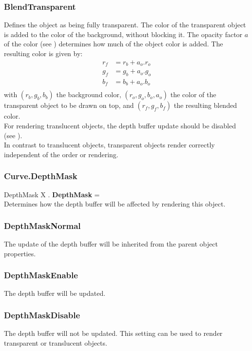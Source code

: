\subsubsection{BlendTransparent \label{T:BlendType|BlendTransparent}}
Defines the object as being fully transparent. The color of the transparent object is added to the color of the background, without blocking it. The opacity factor $a$ of the color (see ) determines how much of the object color is added. The resulting color is given by:
\begin{equation}
\begin{array}{rcl}
r_f & = r_b + a_o . r_o \\
g_f & = g_b + a_o . g_o \\
b_f & = b_b + a_o . b_o \\
\end{array}
\end{equation}
with $(r_b,g_b,b_b)$ the background color, $(r_o,g_o,b_o,a_o)$ the color of the transparent object to be drawn on top, and $(r_f,g_f,b_f)$ the resulting blended color. \\
For rendering translucent objects, the depth buffer update should be disabled (see ). \\
In contrast to translucent objects, transparent objects render correctly independent of the order or rendering.

\subsubsection{Curve.DepthMask \label{F:Curve:DepthMask}}
DepthMask X . \textbf{DepthMask} = \\
Determines how the depth buffer will be affected by rendering this object.

\subsubsection{DepthMaskNormal \label{T:DepthMask|DepthMaskNormal}}
The update of the depth buffer will be inherited from the parent object properties.

\subsubsection{DepthMaskEnable \label{T:DepthMask|DepthMaskEnable}}
The depth buffer will be updated.

\subsubsection{DepthMaskDisable \label{T:DepthMask|DepthMaskDisable}}
The depth buffer will not be updated. This setting can be used to render transparent or translucent objects.

